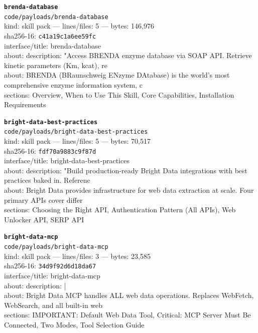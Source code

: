\noindent\textbf{\texttt{brenda-database}}\\
\texttt{code/payloads/brenda-database}\\
kind: skill pack --- lines/files: 5 --- bytes: 146,976\\
sha256-16: \texttt{c41a19c1a6ee59fc}\\
interface/title: brenda-database\\
about: description: "Access BRENDA enzyme database via SOAP API. Retrieve kinetic parameters (Km, kcat), re\\
about: BRENDA (BRaunschweig ENzyme DAtabase) is the world's most comprehensive enzyme information system, c\\
sections: Overview, When to Use This Skill, Core Capabilities, Installation Requirements\\
\vspace*{6.0pt}

\noindent\textbf{\texttt{bright-data-best-practices}}\\
\texttt{code/payloads/bright-data-best-practices}\\
kind: skill pack --- lines/files: 5 --- bytes: 70,517\\
sha256-16: \texttt{fdf70a9883c9f87d}\\
interface/title: bright-data-best-practices\\
about: description: "Build production-ready Bright Data integrations with best practices baked in. Referenc\\
about: Bright Data provides infrastructure for web data extraction at scale. Four primary APIs cover differ\\
sections: Choosing the Right API, Authentication Pattern (All APIs), Web Unlocker API, SERP API\\
\vspace*{6.0pt}

\noindent\textbf{\texttt{bright-data-mcp}}\\
\texttt{code/payloads/bright-data-mcp}\\
kind: skill pack --- lines/files: 3 --- bytes: 23,585\\
sha256-16: \texttt{34d9f92d6d18da67}\\
interface/title: bright-data-mcp\\
about: description: |\\
about: Bright Data MCP handles ALL web data operations. Replaces WebFetch, WebSearch, and all built-in web \\
sections: IMPORTANT: Default Web Data Tool, Critical: MCP Server Must Be Connected, Two Modes, Tool Selection Guide\\
\vspace*{6.0pt}
\newpage

